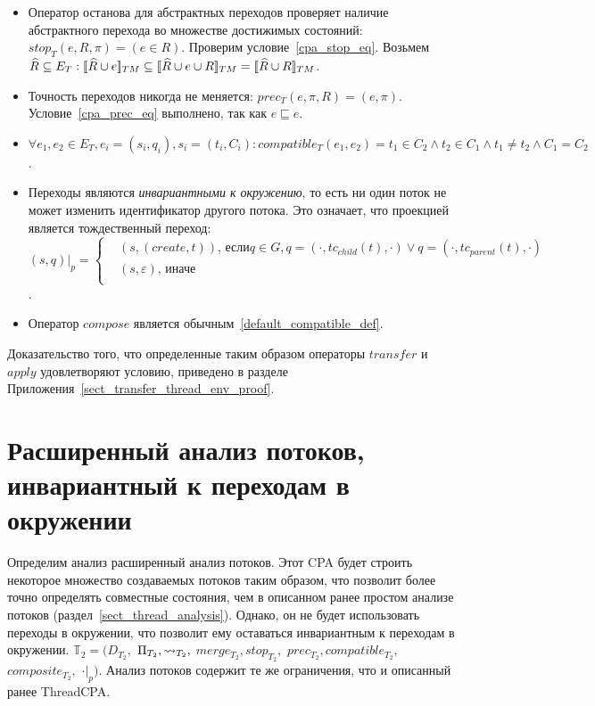 \begin{itemize}
\item Оператор останова для абстрактных переходов проверяет наличие абстрактного перехода во множестве достижимых состояний: $stop_T(e, R, \pi) = (e \in R)$.
Проверим условие~\ref{cpa_stop_eq}.
Возьмем $\widehat{R} \subseteq E_T: [\![ \widehat{R} \cup e ]\!]_{TM} \subseteq [\![ \widehat{R} \cup e \cup R ]\!]_{TM} = [\![ \widehat{R} \cup R ]\!]_{TM}$.

\item Точность переходов никогда не меняется: $prec_T(e, \pi, R) = (e, \pi)$. Условие~\ref{cpa_prec_eq} выполнено, так как $e \sqsubseteq e$.

\item $\forall e_1, e_2 \in E_T, e_i = (s_i, q_i), s_i = (t_i, C_i):compatible_T(e_1,e_2) = t_1 \in C_2 \land t_2 \in C_1  \land t_1 \neq t_2 \land C_1 = C_2$.

\item Переходы являются {\em инвариантными к окружению}, то есть ни один поток не может изменить идентификатор другого потока.
Это означает, что проекцией является тождественный переход:
$(s, q)|_p = 
\begin{cases}
&(s, (create, t)) \mbox{, если} q \in G, q = (\cdot, tc_{child}(t), \cdot) \lor q = (\cdot, tc_{parent}(t), \cdot) \\
&(s, \varepsilon) \mbox{, иначе} \\
\end{cases}$.

\item Оператор $compose$ является обычным~\ref{default_compatible_def}.
\end{itemize}

Доказательство того, что определенные таким образом операторы $transfer$ и $apply$ удовлетворяют условию, приведено в разделе Приложения~\ref{sect_transfer_thread_env_proof}. 


\section{Расширенный анализ потоков, инвариантный к переходам в окружении}
\label{sect_thread_analysis_ext}

Определим анализ расширенный анализ потоков.
Этот CPA будет строить некоторое множество создаваемых потоков таким образом, что позволит более точно определять совместные состояния, чем в описанном ранее простом анализе потоков (раздел~\ref{sect_thread_analysis}). 
Однако, он не будет использовать переходы в окружении, что позволит ему оставаться инвариантным к переходам в окружении.
$\mathbb{T}_2=(D_{T_2},$ $\Pi_{T_2}, \leadsto_{T_2},$ $merge_{T_2}, stop_{T_2},$ $prec_{T_2}, compatible_{T_2},$ $composite_{T_2},$ $\cdot|_p)$.
Анализ потоков содержит те же ограничения, что и описанный ранее ThreadCPA.

